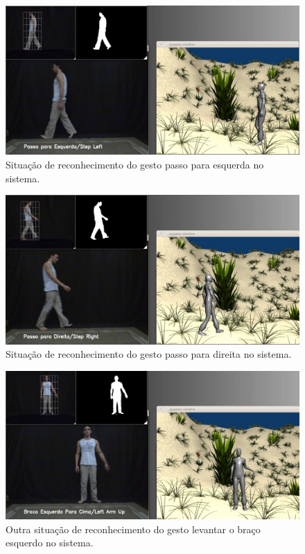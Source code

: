 \begin{figure}[!htbp]
  \includegraphics[scale=0.35]{imagens/sistema_2.jpg}
  \caption{Situação de reconhecimento do gesto passo para esquerda no sistema.}
  \label{img:sistema_2}
\end{figure}

\begin{figure}[!htbp]
  \includegraphics[scale=0.35]{imagens/sistema_3.jpg}
  \caption{Situação de reconhecimento do gesto passo para direita no sistema.}
  \label{img:sistema_3}
\end{figure}

\begin{figure}[!htbp]
  \includegraphics[scale=0.35]{imagens/sistema_4.jpg}
  \caption{Outra situação de reconhecimento do gesto levantar o braço esquerdo no sistema.}
  \label{img:sistema_4}
\end{figure}

